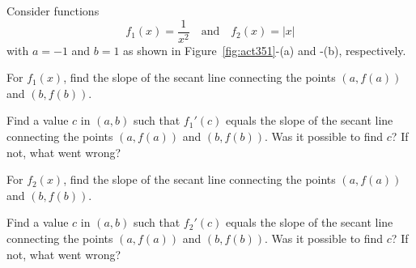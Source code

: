 \begin{activity} \label{A:3.5.1}  Consider functions 
$$f_1(x)=\frac{1}{x^2}\quad \text{and} \quad f_2(x) = |x|$$ 
with $a=-1$ and $b=1$ as shown in Figure~\ref{fig:act351}-(a) and -(b), respectively. 
\ba
 \item For $f_1(x)$, find the slope of the secant line connecting the points $(a,f(a))$ and $(b,f(b))$.
 \item Find a value $c$ in $(a,b)$ such that $f_1'(c)$ equals the slope of the secant line connecting the points $(a,f(a))$ and $(b,f(b))$. Was it possible to find $c$? If not, what went wrong?
  \item For $f_2(x)$, find the slope of the secant line connecting the points $(a,f(a))$ and $(b,f(b))$.
 \item Find a value $c$ in $(a,b)$ such that $f_2'(c)$ equals the slope of the secant line connecting the points $(a,f(a))$ and $(b,f(b))$. Was it possible to find $c$? If not, what went wrong?
	\ea
\end{activity}

\aftera